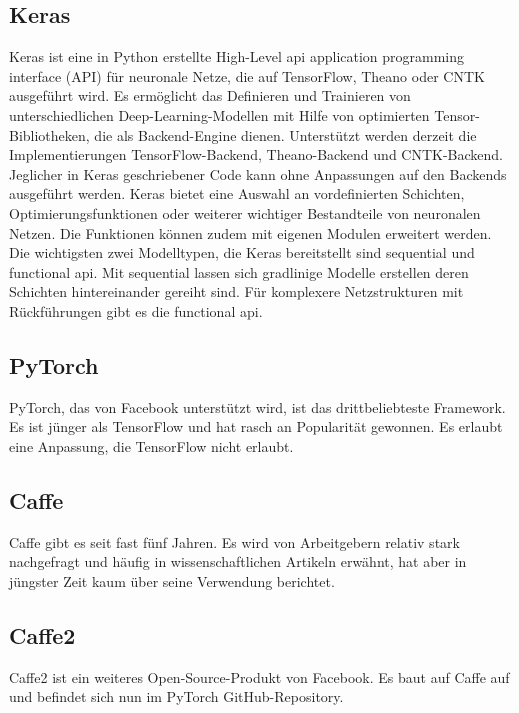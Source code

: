 \subsection{Keras}

Keras ist eine in Python erstellte High-Level \ac{api} application programming interface (API) für neuronale Netze, die auf TensorFlow, Theano oder CNTK ausgeführt wird. Es ermöglicht das Definieren und Trainieren von unterschiedlichen Deep-Learning-Modellen mit Hilfe  von optimierten Tensor-Bibliotheken, die als Backend-Engine dienen. Unterstützt werden derzeit die Implementierungen TensorFlow-Backend, Theano-Backend und CNTK-Backend. 
Jeglicher in Keras geschriebener Code kann ohne Anpassungen auf den Backends ausgeführt werden. Keras bietet eine Auswahl an vordefinierten Schichten, Optimierungsfunktionen oder weiterer wichtiger Bestandteile von neuronalen Netzen. Die Funktionen können zudem mit eigenen Modulen erweitert werden. Die wichtigsten zwei Modelltypen, die Keras bereitstellt sind sequential und functional api. Mit sequential lassen sich gradlinige Modelle erstellen deren Schichten hintereinander gereiht sind. Für komplexere Netzstrukturen mit Rückführungen gibt es die functional api. \cite{Chollet:2018,Keras:2020}

\subsection{PyTorch}

PyTorch, das von Facebook unterstützt wird,  ist das drittbeliebteste Framework. Es ist jünger als TensorFlow und hat rasch an Popularität gewonnen. Es erlaubt eine Anpassung, die TensorFlow nicht erlaubt. \cite{PyTorch:2020}


\subsection{Caffe}

Caffe gibt es seit fast fünf Jahren. Es wird von Arbeitgebern relativ stark nachgefragt und häufig in wissenschaftlichen Artikeln erwähnt, hat aber in jüngster Zeit kaum über seine Verwendung berichtet.
\cite{Caffe:2020}

\subsection{Caffe2}

Caffe2 ist ein weiteres Open-Source-Produkt von Facebook. Es baut auf Caffe auf und befindet sich nun im PyTorch GitHub-Repository. \cite{Caffe2:2020}

